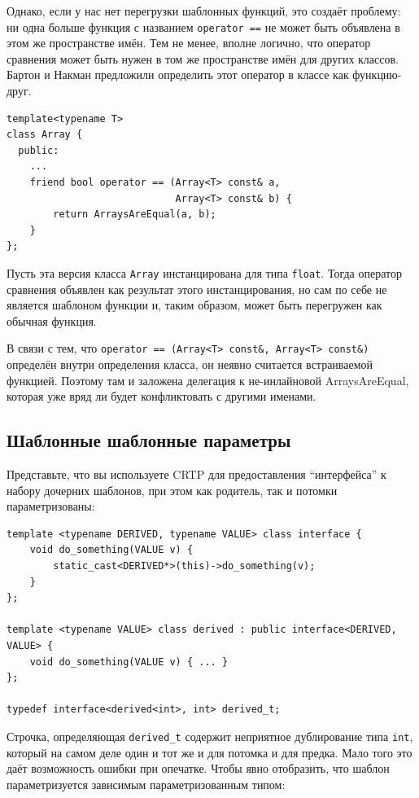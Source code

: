 \documentclass[a4paper,12pt,oneside]{article}
\begin{document}
Однако, если у нас нет перегрузки шаблонных функций, это создаёт проблему: ни одна больше функция с названием \lstinline!operator ==! не может быть объявлена в этом же пространстве имён. Тем не менее, вполне логично, что оператор сравнения может быть нужен в том же пространстве имён для других классов. Бартон и Накман предложили определить этот оператор в классе как функцию-друг.

\begin{lstlisting}
template<typename T> 
class Array { 
  public: 
    ... 
    friend bool operator == (Array<T> const& a, 
                             Array<T> const& b) { 
        return ArraysAreEqual(a, b); 
    } 
}; 
\end{lstlisting}

Пусть эта версия класса \lstinline!Array! инстанцирована для типа \lstinline!float!. Тогда оператор сравнения объявлен как результат этого инстанцирования, но сам по себе не является шаблоном функции и, таким образом, может быть перегружен как обычная функция.

В связи с тем, что \lstinline!operator == (Array<T> const&, Array<T> const&)! определён внутри определения класса, он неявно считается встраиваемой функцией. Поэтому там и заложена делегация к не-инлайновой ArraysAreEqual, которая уже вряд ли будет конфликтовать с другими именами.

\subsection{Шаблонные шаблонные параметры}

Представьте, что вы используете CRTP для предоставления ``интерфейса'' к набору дочерних шаблонов, при этом как родитель, так и потомки параметризованы:

\begin{lstlisting}
template <typename DERIVED, typename VALUE> class interface {
    void do_something(VALUE v) {
        static_cast<DERIVED*>(this)->do_something(v);
    }
};

template <typename VALUE> class derived : public interface<DERIVED, VALUE> {
    void do_something(VALUE v) { ... }
};

typedef interface<derived<int>, int> derived_t;
\end{lstlisting}

Строчка, определяющая \lstinline!derived_t! содержит неприятное дублирование типа  \lstinline!int!, который на самом деле один и тот же и для потомка и для предка. Мало того это даёт возможность ошибки при опечатке. Чтобы явно отобразить, что шаблон параметризуется зависимым параметризованным типом:
\end{document}
